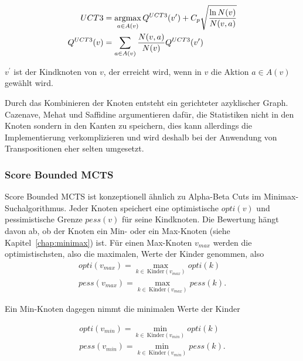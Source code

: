 \begin{equation}
\begin{split}
UCT3 & = \operatorname*{argmax}_{a \in A(v)}Q^{UCT3}(v^\prime) + C_p\sqrt{\frac{\ln N(v)}{N(v,a)}} \\
Q^{UCT3}(v) & = \sum_{a \in A(v)}\frac{N(v,a)}{N(v)}Q^{UCT3}(v^\prime)
\end{split}
\label{eqn:uct3}
\end{equation}

$v^\prime$ ist der Kindknoten von $v$, der erreicht wird, wenn in $v$ die Aktion $a \in A(v)$ gewählt wird.

Durch das Kombinieren der Knoten entsteht ein gerichteter azyklischer Graph. 
Cazenave, Mehat und Saffidine\autocite{cazenaveUCDUpperConfidence2012} argumentieren dafür, die Statistiken nicht in den Knoten sondern in den Kanten zu speichern, dies kann allerdings die Implementierung verkomplizieren und wird deshalb bei der Anwendung von Transpositionen eher selten umgesetzt.

\subsubsection{Score Bounded MCTS}
\label{chap:scorebounded}
Score Bounded MCTS ist konzeptionell ähnlich zu Alpha-Beta Cuts im Minimax-Such\-al\-gorithmus.
Jeder Knoten speichert eine optimistische $opti(v)$ und pessimistische Grenze $pess(v)$ für seine Kindknoten.
Die Bewertung hängt davon ab, ob der Knoten ein Min- oder ein Max-Knoten (siehe Kapitel~\ref{chap:minimax}) ist.
Für einen Max-Knoten $v_{max}$ werden die optimistischsten, also die maximalen, Werte der Kinder genommen, also
\begin{equation}
\begin{split}
opti(v_{max}) = \max_{k \in\ \text{Kinder}(v_{max})}opti(k)\\
pess(v_{max}) = \max_{k \in\ \text{Kinder}(v_{max})}pess(k).
\end{split}
\end{equation}

Ein Min-Knoten dagegen nimmt die minimalen Werte der Kinder 

\begin{equation}
\begin{split}
opti(v_{min}) = \min_{k \in\ \text{Kinder}(v_{min})}opti(k)\\
pess(v_{min}) = \min_{k \in\ \text{Kinder}(v_{min})}pess(k).
\end{split}
\end{equation}


